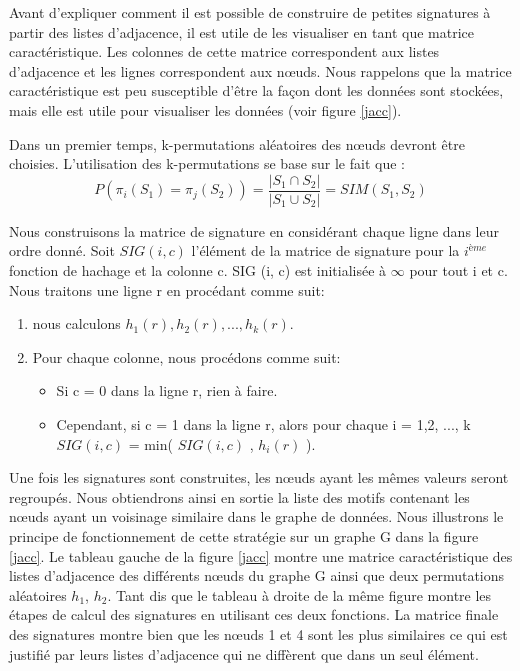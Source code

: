 \documentclass[a4paper,oneside,12pt]{report}
\theoremstyle{definition}
\begin{document}
\begin{enumerate}
Avant d'expliquer comment il est possible de construire de petites signatures à partir des listes d'adjacence, il est utile de les visualiser en tant que matrice caractéristique. Les colonnes de cette matrice correspondent aux listes d'adjacence et les lignes correspondent aux nœuds. Nous rappelons que la matrice caractéristique est peu susceptible d'être la façon dont les données sont stockées, mais elle est utile pour visualiser les données (voir figure \ref{jacc}). 


Dans un premier temps, k-permutations aléatoires des nœuds devront être choisies. L'utilisation des k-permutations se base sur le fait que :
\begin{equation} \label{eq:prob}
P(\pi_i(S_1) = \pi_j(S_2)) = \frac{|S_1 \cap S_2|}{|S_1 \cup S_2|} = SIM(S_1,S_2)
\end{equation}

 Nous construisons la matrice de signature en considérant chaque ligne dans leur ordre donné. Soit $SIG (i, c)$ l'élément de la matrice de signature pour la $i^{ème}$ fonction de hachage et la colonne c. SIG (i, c) est initialisée à $\infty$ pour tout i et c. Nous traitons une ligne r en procédant comme suit:
\begin{enumerate}
\item nous calculons $h_1 (r), h_2 (r), ..., h_k (r)$.
\item Pour chaque colonne, nous procédons comme suit: 
	\begin{itemize}
		\item  Si c = 0 dans la ligne r, rien à faire.
		\item  Cependant, si c = 1 dans la ligne r, alors pour chaque i = 1,2, ..., k  \\$SIG (i, c)$ = min( $SIG (i, c)$ , $h_i(r)$ ).
	\end{itemize}
\end{enumerate}




Une fois les signatures sont construites, les nœuds ayant les mêmes valeurs seront regroupés. Nous obtiendrons ainsi en sortie la liste des motifs contenant les nœuds ayant un voisinage similaire dans le graphe de données. Nous illustrons le principe de fonctionnement de cette stratégie sur un graphe G dans la figure \ref{jacc}. Le tableau gauche de la figure \ref{jacc} montre une matrice caractéristique des listes d'adjacence des différents nœuds du graphe G ainsi que deux permutations aléatoires $h_1$, $h_2$. Tant dis que le tableau à droite de la même figure montre les étapes de calcul des signatures en utilisant ces deux fonctions. La matrice finale des signatures montre bien que les nœuds 1 et 4 sont les plus similaires ce qui est justifié par leurs listes d'adjacence qui ne diffèrent que dans un seul élément.  


\end{enumerate}
\end{document}
